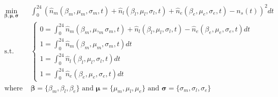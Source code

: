 \begin{equation}
\begin{split}
	\min_{\boldsymbol{\beta}, \boldsymbol{\mu}, \boldsymbol{\sigma}}& \int_{0}^{24}\left(\hat{n}_m(\beta_m,\mu_m,\sigma_m,t) + \hat{n}_l(\beta_l,\mu_l,\sigma_l,t) + \hat{n}_e(\beta_e,\mu_e,\sigma_e,t) - n_s(t)\right)^2 dt\\
	\text{s.t.}&
	\begin{cases}
		0 = \int_{0}^{24}\hat{n}_m(\beta_m,\mu,_m\sigma_m,t) + \hat{n}_l(\beta_l,\mu_l,\sigma_l,t) - \hat{n}_e(\beta_e,\mu_e,\sigma_e,t) dt \\
		1 = \int_{0}^{24}\hat{n}_m(\beta_m,\mu_m,\sigma_m,t) dt \\
		1 = \int_{0}^{24}\hat{n}_l(\beta_l,\mu_l,\sigma_l,t) dt \\
		1 = \int_{0}^{24}\hat{n}_e(\beta_e,\mu_e,\sigma_e,t) dt
	\end{cases}\\
	\text{where }& \boldsymbol{\beta} = \{\beta_m, \beta_l, \beta_e\} \text{ and } \boldsymbol{\mu} = \{\mu_m, \mu_l, \mu_e\} \text{ and } \boldsymbol{\sigma}  = \{\sigma_m, \sigma_l, \sigma_e\}
\end{split}
\label{ch6:equ:normal-distribution-minimisation}
\end{equation}